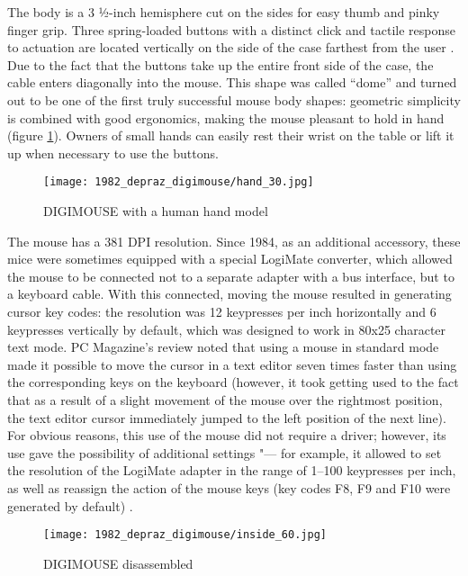 \documentclass[11pt, a4paper]{article}
\begin{document}
The body is a 3 ½-inch hemisphere cut on the sides for easy thumb and pinky finger grip. Three spring-loaded buttons with a distinct click and tactile response to actuation are located vertically on the side of the case farthest from the user \cite{oldmouse}. Due to the fact that the buttons take up the entire front side of the case, the cable enters diagonally into the mouse. This shape was called ``dome'' and turned out to be one of the first truly successful mouse body shapes: geometric simplicity is combined with good ergonomics, making the mouse pleasant to hold in hand (figure \ref{fig:DIGIMOUSEP4Hand}). Owners of small hands can easily rest their wrist on the table or lift it up when necessary to use the buttons.

\begin{figure}[h]
    \centering
    \texttt{[image: 1982\_depraz\_digimouse/hand\_30.jpg]}
    \caption{DIGIMOUSE with a human hand model}
    \label{fig:DIGIMOUSEP4Hand}
\end{figure}

The mouse has a 381 DPI resolution. Since 1984, as an additional accessory, these mice were sometimes equipped with a special LogiMate \cite{oldmouse} converter, which allowed the mouse to be connected not to a separate adapter with a bus interface, but to a keyboard cable. With this connected, moving the mouse resulted in generating cursor key codes:  the resolution was 12 keypresses per inch horizontally and 6 keypresses vertically by default, which was designed to work in 80x25 character text mode. PC Magazine's review noted that using a mouse in standard mode made it possible to move the cursor in a text editor seven times faster than using the corresponding keys on the keyboard (however, it took getting used to the fact that as a result of a slight movement of the mouse over the rightmost position, the text editor cursor immediately jumped to the left position of the next line). For obvious reasons, this use of the mouse did not require a driver; however, its use gave the possibility of additional settings "--- for example, it allowed to set the resolution of the LogiMate adapter in the range of 1--100 keypresses per inch, as well as reassign the action of the mouse keys (key codes F8, F9 and F10 were generated by default) \cite{DIGIMOUSE}.

 \begin{figure}[h]
    \centering
    \texttt{[image: 1982\_depraz\_digimouse/inside\_60.jpg]}
    \caption{DIGIMOUSE disassembled}
    \label{fig:DIGIMOUSEP4Inside}
\end{figure}
\end{document}
